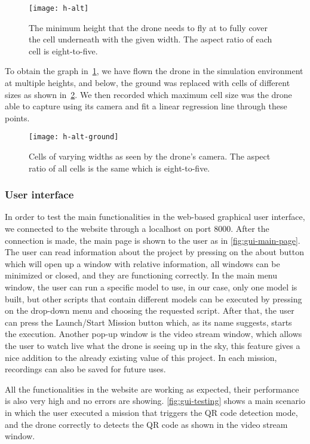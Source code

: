 \documentclass[../main.tex]{subfiles}
\begin{document}
\begin{figure}[tbp]
	\centering
	\texttt{[image: h-alt]}
	\caption{The minimum height that the drone needs to fly at to
        fully cover the cell underneath with the given width.  
        The aspect ratio of each cell is eight-to-five.}
	\label{fig:h-alt}
\end{figure}

To obtain the graph in~\cref{fig:h-alt}, we have flown the drone in
the simulation environment at multiple heights, and below, the ground
was replaced with cells of different sizes as shown
in~\cref{fig:h-alt-ground}.
We then recorded which maximum cell size was the drone able to capture
using its camera and fit a linear regression line through these
points. 

\begin{figure}[tbp]
	\centering
	\texttt{[image: h-alt-ground]}
	\caption{Cells of varying widths as seen by the drone's camera.
        The aspect ratio of all cells is the same which is
        eight-to-five.}
	\label{fig:h-alt-ground}
\end{figure}

\subsubsection{User interface}

In order to test the main functionalities in the web-based graphical user 
interface, we connected to the website through a localhost on port 8000. 
After the connection is made, the main page is shown to the user as in 
\cref{fig:gui-main-page}. The user can read information about the project by 
pressing on the about button which will open up a window with relative 
information, all windows can be minimized or closed, and they are functioning 
correctly. In the main menu window, the user can run a specific model to use, 
in our case, only one model is built, but other scripts that contain different 
models can be executed by pressing on the drop-down menu and choosing the 
requested script. After that, the user can press the Launch/Start Mission 
button which, as its name suggests, starts the execution. 
Another pop-up window is the video stream window, which allows the user to 
watch live what the drone is seeing up in the sky, this feature gives a nice 
addition to the already existing value of this project. In each mission, 
recordings can also be saved for future uses.

All the functionalities in the website are working as expected, their 
performance is also very high and no errors are showing. 
\cref{fig:gui-testing} shows a main scenario in which the user executed a 
mission that triggers the QR code detection mode, and the drone correctly to 
detects the QR code as shown in the video stream window. 
\end{document}
